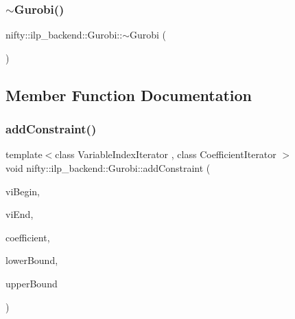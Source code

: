 \subsubsection{\texorpdfstring{$\sim$\+Gurobi()}{~Gurobi()}}
{\footnotesize\ttfamily nifty\+::ilp\+\_\+backend\+::\+Gurobi\+::$\sim$\+Gurobi (\begin{DoxyParamCaption}{ }\end{DoxyParamCaption})\hspace{0.3cm}{\ttfamily [inline]}}



\subsection{Member Function Documentation}
\mbox{\label{classnifty_1_1ilp__backend_1_1Gurobi_ad4e3fa2d4f5fe726a46d40857c36a918}} 
\subsubsection{\texorpdfstring{add\+Constraint()}{addConstraint()}}
{\footnotesize\ttfamily template$<$class Variable\+Index\+Iterator , class Coefficient\+Iterator $>$ \\
void nifty\+::ilp\+\_\+backend\+::\+Gurobi\+::add\+Constraint (\begin{DoxyParamCaption}\item[{Variable\+Index\+Iterator}]{vi\+Begin,  }\item[{Variable\+Index\+Iterator}]{vi\+End,  }\item[{Coefficient\+Iterator}]{coefficient,  }\item[{const double}]{lower\+Bound,  }\item[{const double}]{upper\+Bound }\end{DoxyParamCaption})\hspace{0.3cm}{\ttfamily [inline]}}

\mbox{\label{classnifty_1_1ilp__backend_1_1Gurobi_a138de39ce46740b4728b9d2e7f8bd27b}} 
